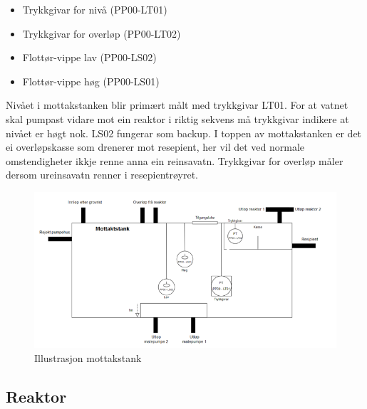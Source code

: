 \begin{itemize}
    \item Trykkgivar for nivå (PP00-LT01)
    \item Trykkgivar for overløp (PP00-LT02)
    \item Flottør-vippe lav (PP00-LS02)
    \item Flottør-vippe høg (PP00-LS01)  
\end{itemize}

Nivået i mottakstanken blir primært målt med trykkgivar LT01. For at vatnet skal pumpast vidare mot ein
reaktor i riktig sekvens må trykkgivar indikere at nivået er høgt nok. LS02 fungerar som backup.
I toppen av mottakstanken er det ei overløpskasse som drenerer mot resepient, her vil det
ved normale omstendigheter ikkje renne anna ein reinsavatn. Trykkgivar for overløp måler
dersom ureinsavatn renner i resepientrøyret.


\begin{figure}[htbp]
    \centering
    \includegraphics[width=1\textwidth]{Figurar/Mottakstank.png}
    \caption{Illustrasjon mottakstank}\label{fig:HMI}
\end{figure}

\newpage
\subsection{Reaktor}

